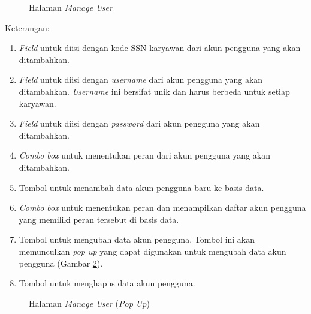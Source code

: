 \begin{figure}[H]
	\centering
	\caption{Halaman \textit{Manage User}}
	\label{fig:page5a}
\end{figure}	

Keterangan:
\begin{enumerate}
	\item \textit{Field} untuk diisi dengan kode SSN karyawan dari akun pengguna yang akan ditambahkan.
	\item \textit{Field} untuk diisi dengan \textit{username} dari akun pengguna yang akan ditambahkan. \textit{Username} ini bersifat unik dan harus berbeda untuk setiap karyawan.
	\item \textit{Field} untuk diisi dengan \textit{password} dari akun pengguna yang akan ditambahkan.
	\item \textit{Combo box} untuk menentukan peran dari akun pengguna yang akan ditambahkan.
	\item Tombol untuk menambah data akun pengguna baru ke basis data.
	\item \textit{Combo box} untuk menentukan peran dan menampilkan daftar akun pengguna yang memiliki peran tersebut di basis data.	
	\item Tombol untuk mengubah data akun pengguna. Tombol ini akan memunculkan \textit{pop up} yang dapat digunakan untuk mengubah data akun pengguna (Gambar \ref{fig:page5b}).
	\item Tombol untuk menghapus data akun pengguna.
\end{enumerate}

\begin{figure}[H]
	\centering
	\caption{Halaman \textit{Manage User} (\textit{Pop Up})}
	\label{fig:page5b}
\end{figure}	


